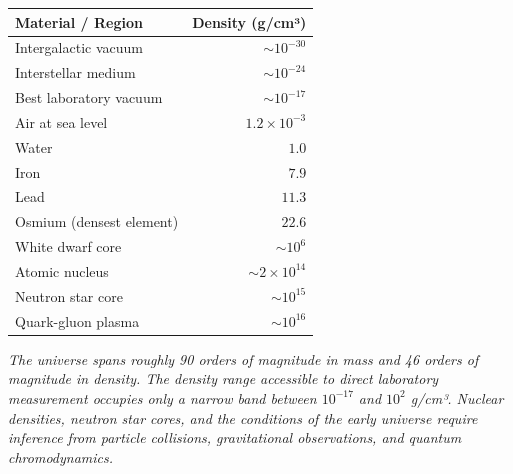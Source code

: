 \begin{tcolorbox}[
    enhanced,
    colframe=technicalcolor,
    colback=gray!5,
    boxrule=0.8pt,
    arc=0mm,
    left=8pt,
    right=8pt,
    top=8pt,
    bottom=8pt,
    title={\textbf{Density Scales in Nature}},
    fonttitle=\bfseries,
    coltitle=white,
    colbacktitle=technicalcolor
]
\small
\renewcommand{\arraystretch}{1.3}
\begin{center}
\begin{tabular}{l r}
\toprule
\textbf{Material / Region} & \textbf{Density (g/cm³)} \\
\midrule
Intergalactic vacuum & $\sim 10^{-30}$ \\[4pt]
Interstellar medium & $\sim 10^{-24}$ \\[4pt]
Best laboratory vacuum & $\sim 10^{-17}$ \\[4pt]
Air at sea level & $1.2 \times 10^{-3}$ \\[4pt]
Water & $1.0$ \\[4pt]
Iron & $7.9$ \\[4pt]
Lead & $11.3$ \\[4pt]
Osmium (densest element) & $22.6$ \\[4pt]
White dwarf core & $\sim 10^{6}$ \\[4pt]
Atomic nucleus & $\sim 2 \times 10^{14}$ \\[4pt]
Neutron star core & $\sim 10^{15}$ \\[4pt]
Quark-gluon plasma & $\sim 10^{16}$ \\[4pt]
\bottomrule
\end{tabular}
\end{center}

\vspace{0.5em}
\footnotesize\itshape
The universe spans roughly 90 orders of magnitude in mass and 46 orders of magnitude in density. The density range accessible to direct laboratory measurement occupies only a narrow band between $10^{-17}$ and $10^{2}$ g/cm³. Nuclear densities, neutron star cores, and the conditions of the early universe require inference from particle collisions, gravitational observations, and quantum chromodynamics.
\end{tcolorbox}